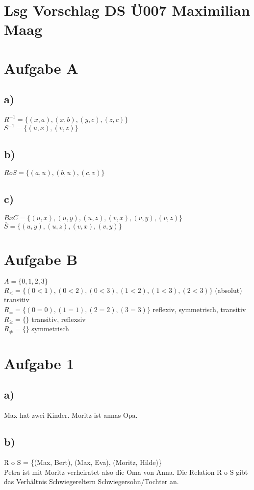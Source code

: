 \documentclass{article}
\begin{document}
	\section*{Lsg Vorschlag DS Ü007 Maximilian Maag}
	\section*{Aufgabe A}
	\subsection*{a)}
	$R^{-1} = \{(x,a), (x,b), (y,c), (z,c)\}$ \\
	$S^{-1} = \{(u,x), (v,z)\}$
	\subsection*{b)}
	$R o S = \{(a,u), (b,u), (c,v)\}$
	\subsection*{c)}
	$B x C = \{(u, x), (u,y), (u,z), (v,x), (v,y), (v,z)\}$ \\
	$\overline{S} = \{(u,y), (u,z), (v,x), (v,y)\}$
	\section*{Aufgabe B}
	$A = \{0,1,2,3\}$ \\
	$R_< = \{(0<1), (0<2), (0<3), (1<2), (1<3), (2<3)\}$ (absolut) transitiv \\
	$R_= = \{(0 = 0), (1 = 1), (2 = 2), (3 = 3)\}$ reflexiv, symmetrisch, transitiv \\
	$R_\geq = \{\}$ transitiv, reflexsiv \\
	$R_\neq = \{\}$ symmetrisch
	\section*{Aufgabe 1}
	\subsection*{a)}
	Max hat zwei Kinder. Moritz ist annas Opa.
	\subsection*{b)}
	R o S =  \{(Max, Bert), (Max, Eva), (Moritz, Hilde)\} \\
	Petra ist mit Moritz verheiratet also die Oma von Anna. Die Relation R o S gibt das Verhältnis Schwiegereltern Schwiegersohn/Tochter an.
\end{document}
